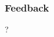 \documentclass[german,aspectratio=169,notoc,titlestyle=tud,draft]{tudbeamer}%
\begin{document}
	    


		    
		    
			

\begin{backmatterframe}
	\frametitle*{Feedback}
	\centering\Huge ? 
\end{backmatterframe}

\end{document}
